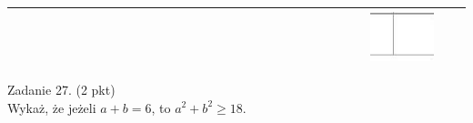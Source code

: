 \documentclass[10pt]{article}
\begin{document}
\begin{center}
\begin{tabular}{|c|c|c|c|c|c|c|c|c|c|c|c|c|c|c|c|c|c|c|c|c|c|c|c|c|c|c|c|c|c|c|}
\hline
 &  &  &  &  &  &  &  &  &  &  &  &  &  &  &  &  &  &  &  &  &  &  &  &  &  &  &  & \includegraphics[max width=\textwidth]{2024_11_21_0fa17f80dfe1c6bd3b66g-08}
 &  &  \\
\hline
\end{tabular}
\end{center}

Zadanie 27. (2 pkt)\\
Wykaż, że jeżeli \(a+b=6\), to \(a^{2}+b^{2} \geq 18\).
\end{document}
